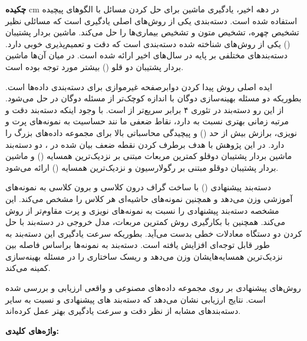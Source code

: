 
\thispagestyle{plain}


\noindent
\textbf{\Large چکیده}
 cm
\noindent در دهه اخیر، یادگیری ماشین برای حل کردن مسائل با الگوهای پیچیده استفاده شده است. دسته‌بندی یکی از روش‌های اصلی یادگیری است که مسائلی نظیر تشخیص چهره، تشخیص متون و تشخیص بیماری‌ها را حل می‌کند. ماشین بردار پشتیبان  () یکی از روش‌های شناخته شده  دسته‌بندی است که دقت و تعمیم‌پذیری خوبی دارد. دسته‌بندهای مختلفی بر پایه  در سال‌های اخیر ارائه شده است. در میان آن‌ها ماشین بردار پشتیبان دو قلو () بیشتر مورد توجه بوده است.

ایده اصلی روش  پیدا کردن دوابرصفحه غیرموازی برای دسته‌بندی داده‌ها است. بطوریکه دو مسئله بهینه‌سازی دوگان با اندازه کوچک‌تر از مسئله دوگان در  حل می‌شود. از این رو دسته‌بند  در تئوری ۴ برابر سریع‌تر از  است. با وجود اینکه دسته‌بند  دقت و مرتبه زمانی بهتری نسبت به  دارد، نقاط ضعفی ما نند حساسیت به نمونه‌های پرت و نویزی، برازش بیش از حد () و پیچیدگی محاسباتی بالا برای مجموعه داده‌های بزرگ را دارد.  در این پژوهش با هدف برطرف کردن نقطه ضعف بیان شده در ، دو دسته‌بند ماشین بردار پشتیبان دوقلو کمترین مربعات مبتنی بر نزدیک‌ترین همسایه () و ماشین بردار پشتیبان دوقلو مبتنی بر رگولارسیون و نزدیک‌ترین همسایه () ارائه می‌شود.  

دسته‌بند پیشنهادی () با ساخت گراف درون کلاسی و برون کلاسی به نمونه‌های آموزشی وزن می‌دهد و همچنین نمونه‌های حاشیه‌ای هر کلاس را مشخص می‌کند. این مشخصه دسته‌بند پیشنهادی را نسبت به نمونه‌های نویزی و پرت مقاوم‌تر از روش   می‌کند. همچنین با بکارگیری روش کمترین مربعات، مدل خروجی در دسته‌بند  با حل کردن دو دستگاه معادلات خطی بدست می‌آید. بطوریکه سرعت یادگیری این دسته‌بند به طور قابل توجه‌ای افزایش یافته است. دسته‌بند  به نمونه‌ها براساس فاصله بین نزدیک‌ترین همسایه‌هایشان وزن می‌دهد و ریسک ساختاری را در مسئله بهینه‌سازی کمینه می‌کند.

روش‌های پیشنهادی بر روی مجموعه داده‌های مصنوعی و واقعی ارزیابی و بررسی شده است. نتایج ارزیابی نشان می‌دهد که دسته‌بند های پیشنهادی  و  نسبت به سایر دسته‌بندهای مشابه از نظر دقت و سرعت یادگیری بهتر عمل کرده‌اند.

\vskip 2cm
\noindent
\textbf{واژه‌های کلیدی:}

